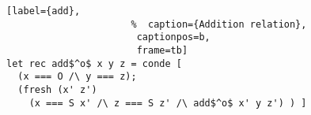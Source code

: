 \begin{figure}[!t]
  \centering
  \begin{minipage}{\columnwidth}
    \begin{lstlisting}[label={add},
                      %  caption={Addition relation},
                       captionpos=b,
                       frame=tb]
let rec add$^o$ x y z = conde [
  (x === O /\ y === z);
  (fresh (x' z')
    (x === S x' /\ z === S z' /\ add$^o$ x' y z') ) ]
    \end{lstlisting}
  \end{minipage}
\end{figure}